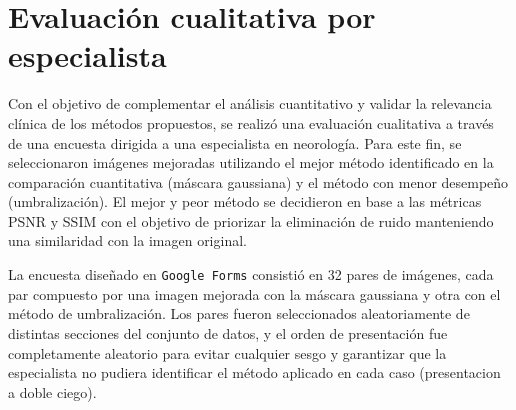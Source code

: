 \begin{table}[H]
\centering
\caption{Comparativa de métricas para los mejores modelos de cada categoría.}
\label{tab:comparativa_final}
\end{table}


\section{Evaluación cualitativa por especialista}

Con el objetivo de complementar el análisis cuantitativo y validar la relevancia clínica de los métodos propuestos, se realizó una evaluación cualitativa a través de una encuesta dirigida a una especialista en neorología. Para este fin, se seleccionaron imágenes mejoradas utilizando el mejor método identificado en la comparación cuantitativa (máscara gaussiana) y el método con menor desempeño (umbralización). El mejor y peor método se decidieron en base a las métricas PSNR y SSIM con el objetivo de priorizar la eliminación de ruido manteniendo una similaridad con la imagen original.

La encuesta diseñado en \texttt{Google Forms} \cite{encuesta2025} consistió en 32 pares de imágenes, cada par compuesto por una imagen mejorada con la máscara gaussiana y otra con el método de umbralización. Los pares fueron seleccionados aleatoriamente de distintas secciones del conjunto de datos, y el orden de presentación fue completamente aleatorio para evitar cualquier sesgo y garantizar que la especialista no pudiera identificar el método aplicado en cada caso (presentacion a doble ciego).

